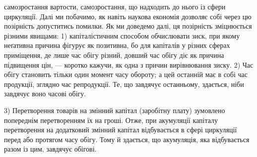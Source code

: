 \parcont{}  %
самозростання вартости, самозростання, що надходить до нього із сфери
циркуляції. Далі ми побачимо, як навіть наукова економія дозволяє собі
через цю позірність допуститись помилки. Як ми доведемо далі, ця позірність
зміцнюється різними явищами: 1) капіталістичним способом обчислювати
зиск, при якому неґативна причина фігурує як позитивна, бо для капіталів
у різних сферах приміщення, де лише час обігу різний, довший час
обігу діє як причина підвищення цін, — коротко кажучи, як одна з причин
вирівнювання зиску. 2) Час обігу становить тільки один момент часу обороту;
а цей останній має в собі час продукції, зглядно час репродукції.
Те, що завдячує останньому, здається, ніби завдячує воно часові обігу.

3) Перетворення товарів на змінний капітал (заробітну плату) зумовлено
попереднім перетворенням їх на гроші. Отже, при акумуляції капіталу
перетворення на додатковий змінний капітал відбувається в сфері циркуляції
перед або протягом часу обігу. Тому й здається, що акумуляція,
яка відбувається разом із цим, завдячує обігові.

